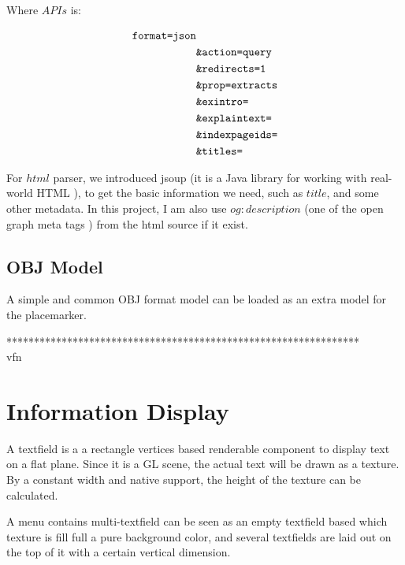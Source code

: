 Where $APIs$ is:

\[
\begin{array}{lr}
\begin{aligned}
\texttt{format=json}&\\
&\texttt{\&action=query}\\
&\texttt{\&redirects=1}\\
&\texttt{\&prop=extracts}\\
&\texttt{\&exintro=}\\
&\texttt{\&explaintext=}\\
&\texttt{\&indexpageids=}\\
&\texttt{\&titles=}\\
\end{aligned}
\end{array}
\]

For $html$ parser, we introduced jsoup (it is a Java library for working with real-world HTML \parencite{joup.2016}), to get the basic information we need, such as $title$, and some other metadata. In this project, I am also use $og:description$ (one of the open graph meta tags \parencite{ogp.2014}) from the html source if it exist.

\subsection{OBJ Model}

A simple and common OBJ format model can be loaded as an extra model for the placemarker.

****************************************************************\\%
vfn\\

\section{Information Display}

A textfield is a a rectangle vertices based renderable component to display text on a flat plane. Since it is a GL scene, the actual text will be drawn as a texture. By a constant width and native  support, the height of the texture can be calculated. 

A menu contains multi-textfield can be seen as an empty textfield based which texture is fill full a pure background color, and several  textfields are laid out on the top of it with a certain vertical dimension.

